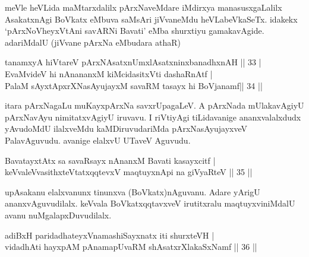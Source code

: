 \begin{artha}
meVle heVLida maMtarxdalilx pArxNaveMdare iMdirxya manasusxgaLalilx AsakatxnAgi BoVkatx eMbuva saMsAri jiVvaneMdu heVLabeVkaSeTx. idakekx `pArxNoVheyxVtAni savARNi Bavati' eMba shurxtiyu gamakavAgide. adariMdalU (jiVvane pArxNa eMbudara athaR)
\end{artha}


\begin{shl}
\footnotemark[2]tanamxyA hiVtareV pArxNAsatxnUmxlAsatxninxbanadhxnAH \hfill|| 33 | \\
EvaMvideV hi nAnananxM kiMcidasitxVti dashaRnAtf | \\
PalaM sAyxtApxrXNasAyujayxM savaRM tasayx hi BoVjanamf\hfill|| 34 || 
\end{shl}

\begin{artha}
itara pArxNagaLu muKayxpArxNa savxrUpagaLeV. A pArxNada mUlakavAgiyU pArxNavAyu nimitatxvAgiyU iruvavu. I riVtiyAgi tiLidavanige ananxvalalxdudx yAvudoMdU ilalxveMdu kaMDiruvudariMda pArxNasAyujayxveV PalavAguvudu. avanige elalxvU UTaveV Aguvudu.
\end{artha}


\begin{shl}
BavatayxtAtx sa savaRsayx nAnanxM Bavati kasayxcitf | \\
keVvaleV\s vasithxteV\s tatxqqtevxV maqtuyxnA\s pi na giVyaRteV \hfill|| 35 || 
\end{shl}

\begin{artha}
upAsakanu elalxvanunx tinunxva (BoVkatx)nAguvanu. Adare yArigU ananxvAguvudilalx. keVvala BoVkatxqqtavxveV irutitxralu maqtuyxviniMdalU avanu nuMgalapxDuvudilalx.
\end{artha}


\begin{shl}
adiBxH paridadhateyxVnamashiSayxnatx iti shurxteVH | \\
vidadhAti hayxpAM pAnamapUvaRM shAsatxrXlakaSxNamf \hfill|| 36 || 
\end{shl}

